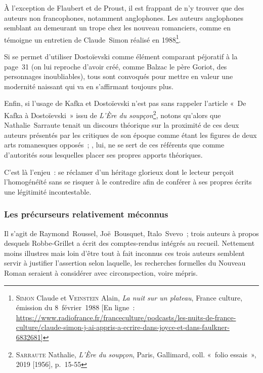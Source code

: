 \documentclass[12pt, a4paper]{article}
\begin{document}
À l'exception de Flaubert et de Proust, il est frappant de n'y trouver que des auteurs non francophones, notamment anglophones. Les auteurs anglophones semblant au demeurant un trope chez les nouveau romanciers, comme en témoigne un entretien de Claude~Simon réalisé en 1988\footnote{\textsc{Simon} Claude et \textsc{Veinstein} Alain, \textit{La nuit sur un plateau}, France culture, émission du 8~février~1988 [En ligne~: \href{https://www.radiofrance.fr/franceculture/podcasts/les-nuits-de-france-culture/claude-simon-j-ai-appris-a-ecrire-dans-joyce-et-dans-faulkner-6832681}{https://www.radiofrance.fr/franceculture/podcasts/les-nuits-de-france-culture/claude-simon-j-ai-appris-a-ecrire-dans-joyce-et-dans-faulkner-6832681}]}.

Si \robbe{} se permet d'utiliser Dostoïevski comme élément comparant péjoratif à la page~31 (on lui reproche d'avoir créé, comme Balzac le père Goriot, des personnages inoubliables), tous sont convoqués pour mettre en valeur une modernité naissant qui va en s'affirmant toujours plus.

Enfin, si l'usage de Kafka et Dostoïevski n'est pas sans rappeler l'article «~De Kafka à Dostoïevski~» issu de \textit{L'Ère du soupçon}\footnote{\textsc{Sarraute} Nathalie, \textit{L'Ère du soupçon}, Paris, Gallimard, coll. «~folio essais~», 2019 [1956], p.~15-55
}, notons qu'alors que Nathalie~Sarraute tenait un discours théorique sur la proximité de ces deux auteurs présentés par les critiques de son époque comme étant les figures de deux arts romanesques opposés~; \robbe, lui, ne se sert de ces référents que comme d'autorités sous lesquelles placer ses propres apports théoriques.

C'est là l'enjeu~: se réclamer d'un héritage glorieux dont le lecteur perçoit l'homogénéïté sans se risquer à le contredire afin de conférer à ses propres écrits une légitimité incontestable.

\subsubsection{Les précurseurs relativement méconnus}
Il s'agit de Raymond~Roussel, Joë~Bousquet, Italo~Svevo~; trois auteurs à propos desquels Robbe-Grillet a écrit des comptes-rendus intégrés au recueil. Nettement moins illustres mais loin d'être tout à fait inconnus ces trois auteurs semblent servir à justifier l'assertion selon laquelle, les recherches formelles du Nouveau Roman seraient à considérer avec circonspection, voire mépris.
\end{document}
